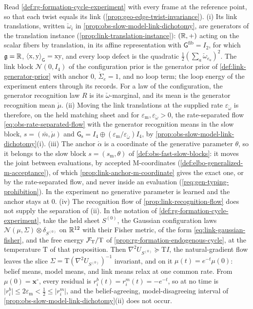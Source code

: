 Read \cref{def:rg-formation-cycle-experiment} with every frame at the reference point, so that each
twist equals its link (\cref{prop:geo-edge-twist-invariance}).
(i) Its link translations, written $\check\omega_i$ in \cref{prop:obs-slow-model-link-dichotomy}, are
generators of the translation instance (\cref{prop:link-translation-instance}): $(\mathbb R,+)$ acting on the
scalar fibers by translation, in its affine representation with $\mathsf G^{\mathrm{fib}}=I_2$, for
which $\mathfrak g=\mathbb R$, $\langle\mathrm x,\mathrm y\rangle_{\mathsf G}=\mathrm x\mathrm y$, and every loop
defect is the quadratic $\tfrac12(\sum_a\check\omega_{e_a})^2$. The link block $\mathcal N(0,I_4)$ of the
configuration prior is the generator prior of \cref{def:link-generator-prior} with anchor $0$,
$\mathring\Sigma_e=1$, and no loop term; the loop energy of the experiment enters through its
records. For a law of the configuration, the generator
recognition law $R$ is its $\check\omega$-marginal, and its mean is the generator recognition mean
$\mathring\mu$.
(ii) Moving the link translations at the supplied rate $\varepsilon_{\check\omega}$ is therefore, on
the held matching sheet and for $\varepsilon_{\mathrm m},\varepsilon_{\check\omega}>0$, the
rate-separated flow \eqref{eq:obs-rate-separated-flow} with the generator recognition means in the
slow block, $s=(\bar m,\mathring\mu)$ and
$\mathsf G_{\mathrm s}=I_4\oplus(\varepsilon_{\mathrm m}/\varepsilon_{\check\omega})I_4$, by
\cref{prop:obs-slow-model-link-dichotomy}(i).
(iii) The anchor $\mathring\alpha$ is a coordinate of the generative parameter $\theta$, so it
belongs to the slow block $s=(s_{\mathrm m},\theta)$ of \cref{def:obs-fast-slow-blocks}: it moves the
joint between evaluations, by accepted M-coordinates (\cref{def:elbo-generalized-m-acceptance}), of
which \cref{prop:link-anchor-m-coordinate} gives the exact one, or by the rate-separated flow, and
never inside an evaluation (\cref{req:gen-typing-prohibition}). In the experiment no generative
parameter is learned and the anchor stays at $0$.
(iv) The recognition flow of \cref{prop:link-recognition-flow} does not supply the separation of
(ii). In the notation of \cref{def:rg-formation-cycle-experiment}, take the held sheet $S^{(0)}$, the
Gaussian configuration laws
$\mathcal N(\mu,\Sigma)\otimes\delta_{S^{(0)}}$ on $\mathbb R^{12}$ with their Fisher metric, of the form
\eqref{eq:link-gaussian-fisher}, and the free energy $\mathcal F_{\mathrm T}/\mathrm T$ of
\cref{prop:rg-formation-endogenous-cycle}, at the temperature $\mathrm T$ of that proposition. Then
$\nabla^2U_{S^{(0)}}\succeq\mathrm TI$, the natural-gradient flow leaves the slice
$\Sigma=\mathrm T(\nabla^2U_{S^{(0)}})^{-1}$ invariant, and on it $\mu(t)=e^{-t}\mu(0)$: belief means,
model means, and link means relax at one common rate. From
$\mu(0)=\mathbf x^\circ$, every residual is $r^b_i(t)=r^m_i(t)=-e^{-t}$, so at no time is
$\lvert r^b_i\rvert\leq2\varepsilon_{\mathrm m}<\tfrac12\leq\lvert r^m_i\rvert$, and the
belief-agreeing, model-disagreeing interval of \cref{prop:obs-slow-model-link-dichotomy}(ii) does not
occur. 

